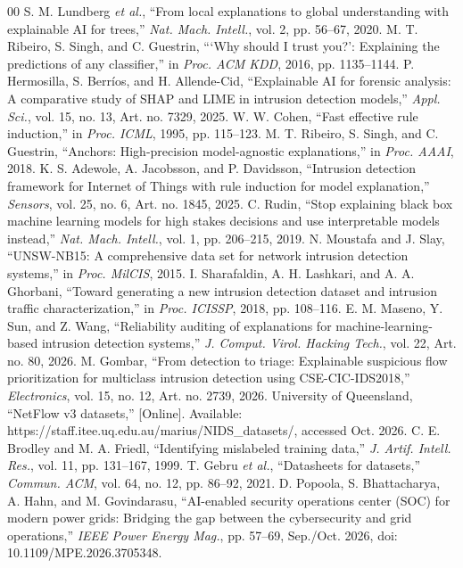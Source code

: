 \documentclass[journal]{IEEEtran}
\begin{document}
\begin{thebibliography}{00}
 S. M. Lundberg \emph{et al.}, ``From local explanations to global understanding with explainable AI for trees,'' \emph{Nat. Mach. Intell.}, vol. 2, pp. 56--67, 2020.
 M. T. Ribeiro, S. Singh, and C. Guestrin, ```Why should I trust you?': Explaining the predictions of any classifier,'' in \emph{Proc. ACM KDD}, 2016, pp. 1135--1144.
 P. Hermosilla, S. Berr\'ios, and H. Allende-Cid, ``Explainable AI for forensic analysis: A comparative study of SHAP and LIME in intrusion detection models,'' \emph{Appl. Sci.}, vol. 15, no. 13, Art. no. 7329, 2025.
 W. W. Cohen, ``Fast effective rule induction,'' in \emph{Proc. ICML}, 1995, pp. 115--123.
 M. T. Ribeiro, S. Singh, and C. Guestrin, ``Anchors: High-precision model-agnostic explanations,'' in \emph{Proc. AAAI}, 2018.
 K. S. Adewole, A. Jacobsson, and P. Davidsson, ``Intrusion detection framework for Internet of Things with rule induction for model explanation,'' \emph{Sensors}, vol. 25, no. 6, Art. no. 1845, 2025.
 C. Rudin, ``Stop explaining black box machine learning models for high stakes decisions and use interpretable models instead,'' \emph{Nat. Mach. Intell.}, vol. 1, pp. 206--215, 2019.
 N. Moustafa and J. Slay, ``UNSW-NB15: A comprehensive data set for network intrusion detection systems,'' in \emph{Proc. MilCIS}, 2015.
 I. Sharafaldin, A. H. Lashkari, and A. A. Ghorbani, ``Toward generating a new intrusion detection dataset and intrusion traffic characterization,'' in \emph{Proc. ICISSP}, 2018, pp. 108--116.
 E. M. Maseno, Y. Sun, and Z. Wang, ``Reliability auditing of explanations for machine-learning-based intrusion detection systems,'' \emph{J. Comput. Virol. Hacking Tech.}, vol. 22, Art. no. 80, 2026.
 M. Gombar, ``From detection to triage: Explainable suspicious flow prioritization for multiclass intrusion detection using CSE-CIC-IDS2018,'' \emph{Electronics}, vol. 15, no. 12, Art. no. 2739, 2026.
 University of Queensland, ``NetFlow v3 datasets,'' [Online]. Available: https://staff.itee.uq.edu.au/marius/NIDS\_datasets/, accessed Oct. 2026.
 C. E. Brodley and M. A. Friedl, ``Identifying mislabeled training data,'' \emph{J. Artif. Intell. Res.}, vol. 11, pp. 131--167, 1999.
 T. Gebru \emph{et al.}, ``Datasheets for datasets,'' \emph{Commun. ACM}, vol. 64, no. 12, pp. 86--92, 2021.
 D. Popoola, S. Bhattacharya, A. Hahn, and M. Govindarasu, ``AI-enabled security operations center (SOC) for modern power grids: Bridging the gap between the cybersecurity and grid operations,'' \emph{IEEE Power Energy Mag.}, pp. 57--69, Sep./Oct. 2026, doi: 10.1109/MPE.2026.3705348.

\end{thebibliography}
\end{document}
